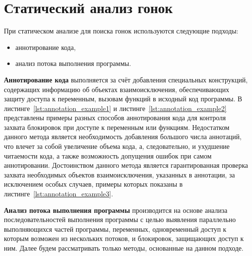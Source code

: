 \chapter{Статический анализ гонок}
\label{cha:static-methods}

При статическом анализе для поиска гонок используются следующие подходы:
\begin{itemize}
\item аннотирование кода,
\item анализ потока выполнения программы.
\end{itemize}

\textbf{Аннотирование кода} выполняется за счёт добавления специальных конструкций, содержащих информацию об объектах взаимоисключения, обеспечивающих защиту доступа к переменным, вызовам функций в исходный код программы. В листинге~\ref{lst:annotation_example1} и листинге~\ref{lst:annotation_example2} представлены примеры разных способов аннотирования кода для контроля захвата блокировок при доступе к переменным или функциям. Недостатком данного метода является необходимость добавления большого числа аннотаций, что влечет за собой увеличение объема кода, а, следовательно, и ухудшение читаемости кода, а также возможность допущения ошибок при самом аннотировании. Достоинством данного метода является гарантированная проверка захвата необходимых объектов взаимоисключения, указанных в аннотации, за исключением особых случаев, примеры которых показаны в листинге~\ref{lst:annotation_example3}.







\textbf{Анализ потока выполнения программы} производится на основе анализа последовательностей выполнения программы с целью выявления параллельно выполняющихся частей программы, переменных, одновременный доступ к которым возможен из нескольких потоков, и блокировок, защищающих доступ к ним. Далее будем рассматривать только методы, основанные на данном подходе.

